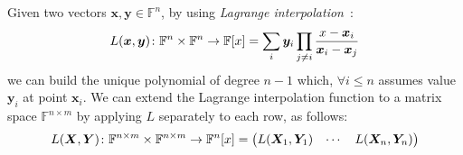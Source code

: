 Given two vectors \(\bm{x}, \bm{y} \in \mathbb{F}^n\), by using 
\emph{Lagrange interpolation}~\cite{Waring1779}:
\[
  \call{L}{\bm{x}, \bm{y}}\colon \mathbb{F}^n \times \mathbb{F}^n \to \extend{\mathbb{F}}{x} = 
  \sum_{i}{\bm{y}_i\prod_{j \neq i}{\frac{x - \bm{x}_i}{\bm{x}_i - \bm{x}_j}}}
\]
we can build the unique polynomial of degree \(n - 1\) which, \(\forall i \le n\) assumes 
value \(\bm{y}_i\) at point \(\bm{x}_i\).
We can extend the Lagrange interpolation function to a matrix space \(\mathbb{F}^{n \times m}\)
by applying \(L\) separately to each row, as follows:
\[
  \call{L}{\bm{X}, \bm{Y}}\colon \mathbb{F}^{n \times m} \times \mathbb{F}^{n \times m} \to 
  \extend{\mathbb{F}^n}{x} = 
  \begin{pmatrix*} 
    \call{L}{\bm{X}_1, \bm{Y}_1} & \cdots & \call{L}{\bm{X}_n, \bm{Y}_n}
  \end{pmatrix*}
\]
